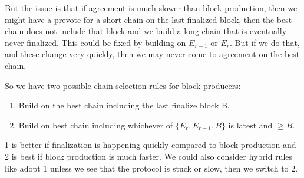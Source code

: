 \documentclass[a4paper,UKenglish,cleveref, autoref, thm-restate, anonymous]{lipics-v2019}
\begin{document}
{But the issue is that if agreement is much slower than block production, then we might have a prevote for a short chain on the last finalized block, then the best chain does not include that block and we build a long chain that is eventually never finalized. This could be fixed by building on $E_{r-1}$ or $E_r$. But if we do that, and these change very quickly, then we may never come to agreement on the best chain. 

So we have two possible chain selection rules for block producers:

\begin{enumerate}
\item Build on the best chain including the last finalize block B.
\item Build on best chain including whichever of $\{E_r,E_{r-1},B\}$ is latest and $\geq B$.
\end{enumerate}

1 is better if finalization is happening quickly compared to block production and 2 is best if block production is much faster. We could also consider hybrid rules like adopt 1 unless we see that the protocol is stuck or slow, then we switch to 2.}
\end{document}
